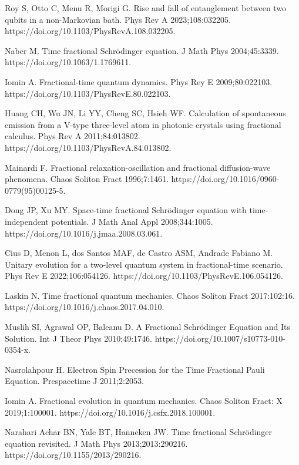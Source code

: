 \documentclass[
showpacs,  %
showkeys,  %
aps,       %
amsthm,    %
amsmath,   %
amsfonts,  %
amssymb    %
]{revtex4-1}          %
\begin{document}
\begin{thebibliography}{}
Roy S, Otto C, Menu R, Morigi G. Rise and fall of entanglement between two qubits in a non-Markovian bath. Phys Rev A 2023;108:032205. https://doi.org/10.1103/PhysRevA.108.032205.

Naber M. Time fractional Schr\"{o}dinger equation. J Math Phys 2004;45:3339. https://doi.org/10.1063/1.1769611.

Iomin A. Fractional-time quantum dynamics. Phys Rey E 2009;80:022103. https://doi.org/10.1103/PhysRevE.80.022103.

Huang CH, Wu JN, Li YY, Cheng SC, Hsieh WF. Calculation of spontaneous emission from a V-type three-level atom in photonic crystals using fractional calculus. Phys Rev A 2011;84:013802. https://doi.org/10.1103/PhysRevA.84.013802.

Mainardi F. Fractional relaxation-oscillation and fractional diffusion-wave phenomena. Chaos Soliton Fract 1996;7:1461. https://doi.org/10.1016/0960-0779(95)00125-5.

Dong JP, Xu MY. Space-time fractional Schr\"{o}dinger equation with time-independent potentials. J Math Anal Appl 2008;344:1005. https://doi.org/10.1016/j.jmaa.2008.03.061.

Cius D, Menon L, dos Santos MAF, de Castro ASM, Andrade Fabiano M. Unitary evolution for a two-level quantum system in fractional-time scenario. Phys Rev E 2022;106:054126. https://doi.org/10.1103/PhysRevE.106.054126.

Laskin N. Time fractional quantum mechanics. Chaos Soliton Fract 2017:102:16. https://doi.org/10.1016/j.chaos.2017.04.010.

Muslih SI, Agrawal OP, Baleanu D. A Fractional Schr\"{o}dinger Equation and Its Solution. Int J Theor Phys 2010;49:1746. https://doi.org/10.1007/s10773-010-0354-x.

Nasrolahpour H. Electron Spin Precession for the Time Fractional Pauli Equation. Prespacetime J 2011;2:2053.

Iomin A. Fractional evolution in quantum mechanics. Chaos Soliton Fract: X 2019;1:100001. https://doi.org/10.1016/j.csfx.2018.100001.

Narahari Achar BN, Yale BT, Hanneken JW. Time fractional Schr\"{o}dinger equation revisited. J Math Phys 2013;2013:290216. https://doi.org/10.1155/2013/290216.


\end{thebibliography}
\end{document}
